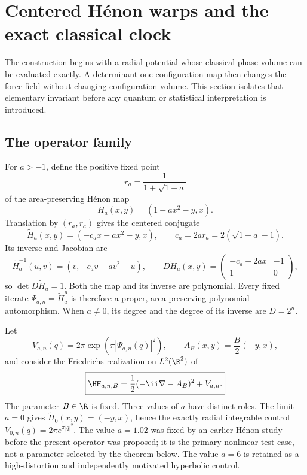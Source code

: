 \section{Centered H\'enon warps and the exact classical clock}
\label{sec:model-clock}

The construction begins with a radial potential whose classical phase volume
can be evaluated exactly.  A determinant-one configuration map then changes
the force field without changing configuration volume.  This section isolates
that elementary invariant before any quantum or statistical interpretation is
introduced.

\subsection{The operator family}

For \(a>-1\), define the positive fixed point
\begin{equation}
 r_a=\frac{1}{1+\sqrt{1+a}}
\end{equation}
of the area-preserving H\'enon map
\begin{equation}
 H_a(x,y)=(1-ax^2-y,x).
\end{equation}
Translation by \((r_a,r_a)\) gives the centered conjugate
\begin{equation}
 \widetilde H_a(x,y)=(-c_ax-ax^2-y,x),
 \qquad c_a=2ar_a=2(\sqrt{1+a}-1).
 \label{eq:centered-henon}
\end{equation}
Its inverse and Jacobian are
\begin{equation}
 \widetilde H_a^{-1}(u,v)=(v,-c_av-av^2-u),
 \qquad
 D\widetilde H_a(x,y)=
 \begin{pmatrix}-c_a-2ax&-1\\1&0\end{pmatrix},
\end{equation}
so \(\det D\widetilde H_a=1\).  Both the map and its inverse are
polynomial.  Every fixed iterate
\(\Psi_{a,n}=\widetilde H_a^n\) is therefore a proper, area-preserving
polynomial automorphism.  When \(a\ne0\), its degree and the degree of its
inverse are \(D=2^n\).

Let
\begin{equation}
 V_{a,n}(q)=2\pi\exp\!\left(\pi|\Psi_{a,n}(q)|^2\right),
 \qquad
 A_B(x,y)=\frac{B}{2}(-y,x),
 \label{eq:potential-vector}
\end{equation}
and consider the Friedrichs realization on \(L^2(\R^2)\) of
\begin{equation}
 \boxed{
 \HH_{a,n,B}
 =\frac12(-\ii\nabla-A_B)^2+V_{a,n}.}
 \label{eq:main-operator}
\end{equation}
The parameter \(B\in\R\) is fixed.  Three values of \(a\) have distinct
roles.  The limit \(a=0\) gives
\(\widetilde H_0(x,y)=(-y,x)\), hence the exactly radial integrable control
\(V_{0,n}(q)=2\pi e^{\pi|q|^2}\).  The value \(a=1.02\) was fixed by an
earlier H\'enon study before the present operator was proposed; it is the
primary nonlinear test case, not a parameter selected by the theorem below.
The value \(a=6\) is retained as a high-distortion and independently motivated
hyperbolic control.

